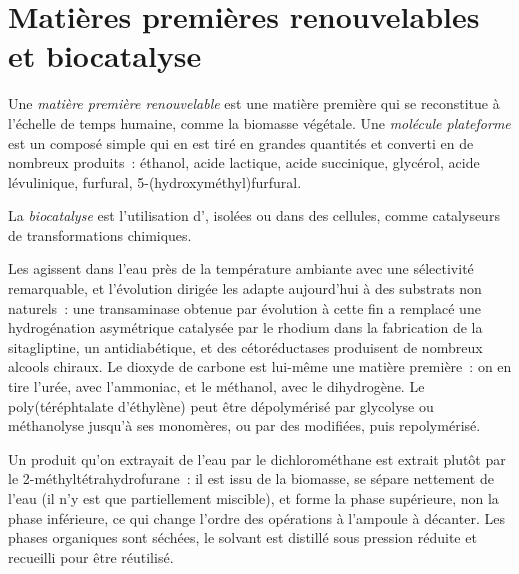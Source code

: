 \section{Matières premières renouvelables et biocatalyse}

\begin{definition}\label{def:b3:green-industrial:feedstock}
Une \emph{matière première renouvelable} est une matière
première qui se reconstitue à l'échelle de temps humaine, comme la biomasse
végétale. Une \emph{molécule plateforme} est un composé
simple qui en est tiré en grandes quantités et converti en de nombreux
produits~: éthanol, acide lactique, acide succinique, glycérol, acide
lévulinique, furfural, 5-(hydroxyméthyl)furfural.
\end{definition}

\begin{definition}[Biocatalyse]\label{def:b3:green-industrial:biocatalysis}
La \emph{biocatalyse} est l'utilisation d',
isolées ou dans des cellules, comme catalyseurs de transformations
chimiques.
\end{definition}

Les  agissent dans l'eau près de la température ambiante avec une
sélectivité remarquable, et l'évolution dirigée les adapte aujourd'hui à
des substrats non naturels~: une transaminase obtenue par évolution à cette
fin a remplacé une hydrogénation asymétrique catalysée par le rhodium dans
la fabrication de la sitagliptine, un antidiabétique, et des cétoréductases
produisent de nombreux alcools chiraux. Le dioxyde de carbone est lui-même
une matière première~: on en tire l'urée, avec l'ammoniac, et le méthanol,
avec le dihydrogène. Le poly(téréphtalate d'éthylène) peut être
dépolymérisé par glycolyse ou méthanolyse jusqu'à ses monomères, ou par des
 modifiées, puis repolymérisé.

\begin{inthelab}
Un produit qu'on extrayait de l'eau par le dichlorométhane est extrait
plutôt par le 2-méthyltétrahydrofurane~: il est issu de la biomasse, se
sépare nettement de l'eau (il n'y est que partiellement miscible), et forme
la phase supérieure, non la phase inférieure, ce qui change l'ordre des
opérations à l'ampoule à décanter. Les phases organiques sont séchées, le
solvant est distillé sous pression réduite et recueilli pour être
réutilisé.
\end{inthelab}

